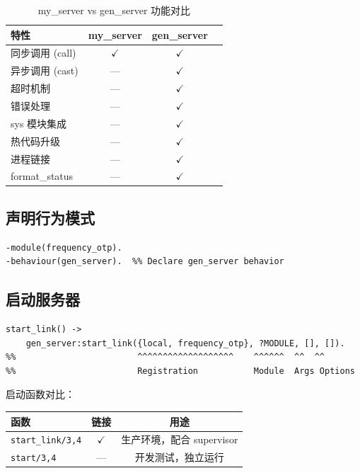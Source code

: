 \documentclass[a4paper,11pt]{article}
\begin{document}
\begin{table}[H]
\centering
\begin{tabular}{@{}lccc@{}}
\toprule
\textbf{特性} & \textbf{my\_server} & \textbf{gen\_server} \\
\midrule
同步调用 (call)    & $\checkmark$ & $\checkmark$ \\
异步调用 (cast)    & ---        & $\checkmark$ \\
超时机制           & ---        & $\checkmark$ \\
错误处理           & ---        & $\checkmark$ \\
sys 模块集成       & ---        & $\checkmark$ \\
热代码升级         & ---        & $\checkmark$ \\
进程链接           & ---        & $\checkmark$ \\
format\_status     & ---        & $\checkmark$ \\
\bottomrule
\end{tabular}
\caption{my\_server vs gen\_server 功能对比}
\label{tab:comparison}
\end{table}

\subsection{声明行为模式}

\begin{lstlisting}[style=erlangstyle]
-module(frequency_otp).
-behaviour(gen_server).  %% Declare gen_server behavior
\end{lstlisting}

\subsection{启动服务器}

\begin{lstlisting}[style=erlangstyle, caption={启动 gen\_server}]
%% start_link: start and link to calling process
start_link() ->
    gen_server:start_link({local, frequency_otp}, ?MODULE, [], []).
%%                        ^^^^^^^^^^^^^^^^^^^    ^^^^^^  ^^  ^^
%%                        Registration           Module  Args Options
\end{lstlisting}

启动函数对比：

\begin{table}[H]
\centering
\begin{tabular}{@{}lcc@{}}
\toprule
\textbf{函数} & \textbf{链接} & \textbf{用途} \\
\midrule
\texttt{start\_link/3,4} & $\checkmark$ & 生产环境，配合 supervisor \\
\texttt{start/3,4}       & ---        & 开发测试，独立运行 \\
\bottomrule
\end{tabular}
\end{table}
\end{document}
